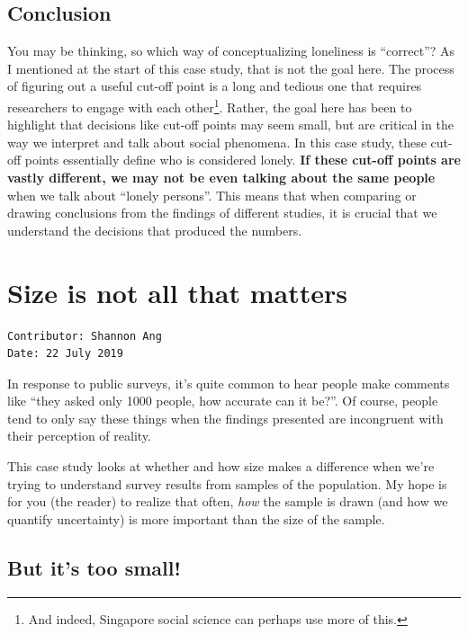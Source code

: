 \documentclass[
  openany]{book}
\begin{document}
\hypertarget{conclusion-1}{%
\section{Conclusion}\label{conclusion-1}}

You may be thinking, so which way of conceptualizing loneliness is ``correct''? As I mentioned at the start of this case study, that is not the goal here. The process of figuring out a useful cut-off point is a long and tedious one that requires researchers to engage with each other\footnote{And indeed, Singapore social science can perhaps use more of this.}. Rather, the goal here has been to highlight that decisions like cut-off points may seem small, but are critical in the way we interpret and talk about social phenomena. In this case study, these cut-off points essentially define who is considered lonely. \textbf{If these cut-off points are vastly different, we may not be even talking about the same people} when we talk about ``lonely persons''. This means that when comparing or drawing conclusions from the findings of different studies, it is crucial that we understand the decisions that produced the numbers.

\hypertarget{samples}{%
\chapter{Size is not all that matters}\label{samples}}

\begin{verbatim}
Contributor: Shannon Ang
Date: 22 July 2019
\end{verbatim}

In response to public surveys, it's quite common to hear people make comments like ``they asked only 1000 people, how accurate can it be?''. Of course, people tend to only say these things when the findings presented are incongruent with their perception of reality.

This case study looks at whether and how size makes a difference when we're trying to understand survey results from samples of the population. My hope is for you (the reader) to realize that often, \emph{how} the sample is drawn (and how we quantify uncertainty) is more important than the size of the sample.

\hypertarget{sample-worklife}{%
\section{But it's too small!}\label{sample-worklife}}
\end{document}
